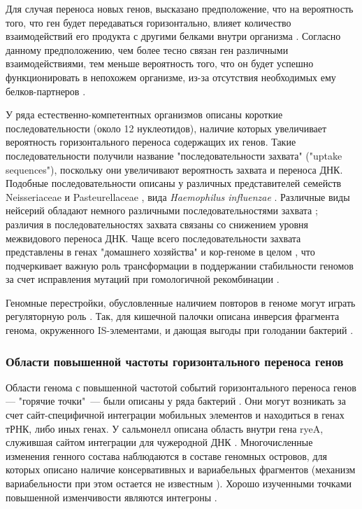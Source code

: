 Для случая переноса новых генов, высказано предположение, что на вероятность того, что ген будет передаваться горизонтально, влияет количество взаимодействий его продукта с другими белками внутри организма \cite{cohen2011complexity}. Согласно данному предположению, чем более тесно связан ген различными взаимодействиями, тем меньше вероятность того, что он будет успешно функционировать в непохожем организме, из-за отсутствия необходимых ему белков-партнеров \cite{novick2020horizontal}.

У ряда естественно-компетентных организмов описаны короткие последовательности (около 12 нуклеотидов), наличие которых увеличивает вероятность горизонтального переноса содержащих их генов. Такие последовательности получили название "последовательности захвата" ("uptake sequences"), поскольку они увеличивают вероятность захвата и переноса ДНК. Подобные последовательности описаны у различных представителей семейств Neisseriaceae и Pasteurellaceae \cite{mell2014natural, spencer2016dna}, вида \textit{Haemophilus influenzae} \cite{smith1995frequency}. Различные виды нейсерий обладают немного различными последовательностями захвата \cite{frye2013dialects}; различия в последовательностях захвата связаны со снижением уровня межвидового переноса ДНК. Чаще всего последовательности захвата представлены в генах "домашнего хозяйства" и кор-геноме в целом \cite{davidsen2004biased}, что подчеркивает важную роль трансформации в поддержании стабильности геномов за счет исправления мутаций при гомологичной рекомбинации \cite{treangen2008impact}.

Геномные перестройки, обусловленные наличием повторов в геноме могут играть регуляторную роль \cite{смирнов2008механизмы}. Так, для кишечной палочки описана инверсия фрагмента генома, окруженного IS-элементами, и дающая выгоды при голодании бактерий \cite {zinser2003bacterial}.

\subsubsection{Области повышенной частоты горизонтального переноса генов}
Области генома с повышенной частотой событий горизонтального переноса генов --- "горячие точки"\ --- были описаны у ряда бактерий \cite{oliveira2017chromosomal}. Они могут возникать за счет сайт-специфичной интеграции мобильных элементов и находиться в генах тРНК, либо иных генах.  У сальмонелл описана область внутри гена ryeA, служившая сайтом интеграции для чужеродной ДНК \cite{balbontin2008insertion}. Многочисленные изменения генного состава наблюдаются в составе геномных островов, для которых описано наличие консервативных и вариабельных фрагментов \cite{vokes1999aerobactin} (механизм вариабельности при этом остается не известным \cite{myers2006role}). Хорошо изученными точками повышенной изменчивости являются интегроны \cite{boucher2007integrons}. 

